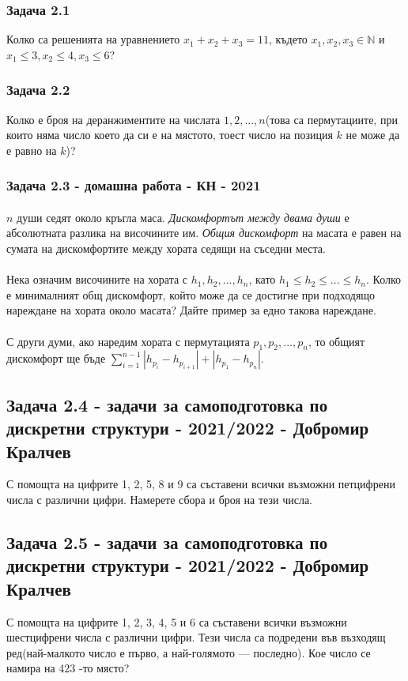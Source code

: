 \documentclass[12pt]{article}
\begin{document}
\subsubsection*{Задача 2.1}
Колко са решенията на уравнението $x_1 + x_2 + x_3 = 11$, където $x_1, x_2, x_3 \in \mathbb{N}$ и $x_1 \leq 3, x_2 \leq 4, x_3 \leq 6$?
\subsubsection*{Задача 2.2}
Колко е броя на деранжиментите на числата $1, 2, ..., n$(това са пермутациите, при които няма число което да си е на мястото, тоест число на позиция $k$ не може да е равно на $k$)?
\subsubsection*{Задача 2.3 - домашна работа - КН - 2021}
\paragraph*{}
$n$ души седят около кръгла маса. \emph{Дискомфортът между двама души} е абсолютната разлика на височините им. \emph{Общия дискомфорт} на масата е равен на
сумата на дискомфортите между хората седящи на съседни места.
\paragraph*{}
Нека означим височините на хората с $h_1, h_2, ..., h_n$, като $h_1 \leq h_2 \leq ... \leq h_n$. Колко е минималният общ дискомфорт, който може да се достигне при подходящо нареждане на хората около масата? Дайте пример за едно такова нареждане.
\paragraph*{}
С други думи, ако наредим хората с пермутацията $p_1, p_2, ..., p_n$, то общият дискомфорт ще бъде $\displaystyle\sum_{i=1}^{n-1} |h_{p_i} - h_{p_{i+1}}| + |h_{p_1} - h_{p_n}|$.

\subsection*{Задача 2.4 - задачи за самоподготовка по дискретни структури - 2021/2022 - Добромир Кралчев}
С помощта на цифрите 1, 2, 5, 8 и 9 са съставени всички възможни петцифрени числа с различни цифри. Намерете сбора и броя на тези числа.

\subsection*{Задача 2.5 - задачи за самоподготовка по дискретни структури - 2021/2022 - Добромир Кралчев}
С помощта на цифрите 1, 2, 3, 4, 5 и 6 са съставени всички възможни шестцифрени числа с различни цифри. Тези числа са подредени във възходящ ред(най-малкото число е първо, а най-голямото — последно). Кое число се намира на 423 -то място?
\end{document}
